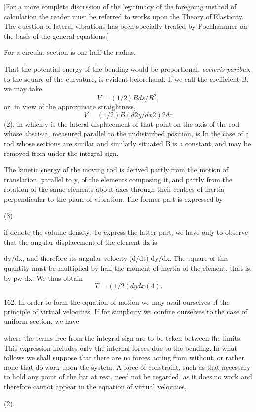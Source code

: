 [For a more complete discussion of the legitimacy of the
foregoing method of calculation the reader must be referred to
works upon the Theory of Elasticity. The question of lateral
vibrations has been specially treated by Pochhammer on the
basis of the general equations.]


For a circular section is one-half the radius.

That the potential energy of the bending would be proportional,
\textit{coeteris paribus}, to the square of the curvature, is evident
beforehand.  If we call the coefficient B, we may take
\[ V= (1/2) B ds/R^2, \]
or, in view of the approximate straightness,
\[ V= (1/2) B (d2 y/ dx2)2 dx \]
(2), in which y is the lateral displacement of that point on the axis of the
rod whose abscissa, measured parallel to the undisturbed position, is In
the case of a rod whose sections are similar and similarly situated B
is a constant, and may be removed from under the integral sign.

The kinetic energy of the moving rod is derived partly from the motion of
translation, parallel to y, of the elements composing it, and partly from the
rotation of the same elements about axes through their centres of inertia
perpendicular to the plane of vibration. The former part is expressed by

(3)

if denote the volume-density. To express the latter part, we have only
to observe that the angular displacement of the element dx is

dy/dx, and therefore its angular velocity (d/dt) dy/dx. The square of
this quantity must be multiplied by half the moment of inertia of the
element, that is, by pw dx. We thus obtain
\[ T = (1/2) dy dx (4).  \]


162. In order to form the equation of motion we may avail ourselves of
the principle of virtual velocities. If for simplicity we confine
ourselves to the case of uniform section, we have

where the terms free from the integral sign are to be taken between the
limits. This expression includes only the internal forces due to the
bending. In what follows we shall suppose that there are no forces
acting from without, or rather none that do work upon the system. A
force of constraint, such as that necessary to hold any point of the bar
at rest, need not be regarded, as it does no work and therefore cannot
appear in the equation of virtual velocities,

(2).

